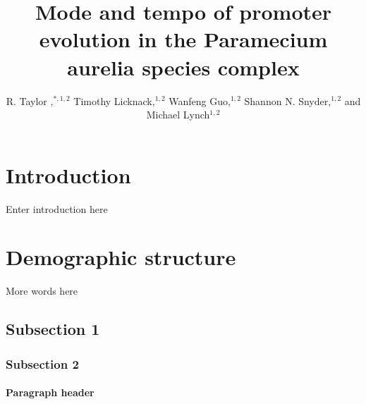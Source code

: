 \documentclass[nogrid]{MBE}%
\begin{document}
\title{Mode and tempo of promoter evolution in the Paramecium aurelia species complex}


\author[Raborn et al.]{R. Taylor ,$^{\ast,1,2}$ Timothy Licknack,$^{1,2}$ Wanfeng Guo,$^{1,2}$ Shannon N. Snyder,$^{1,2}$ and Michael Lynch$^{1,2}$}

\address{$^{1}$Biodesign Center for Mechanisms of Evolution\\
$^{2}$School of Life Sciences, Arizona State University, Room C445 797 E. Tyler Street, Tempe, AZ 85281}







\maketitle



\section{{Introduction}\label{sec:Intro}}

Enter introduction here



\section{Demographic structure}

More words here

\subsection{Subsection 1}



\subsubsection{Subsection 2}




\paragraph{Paragraph header} 
\end{document}
